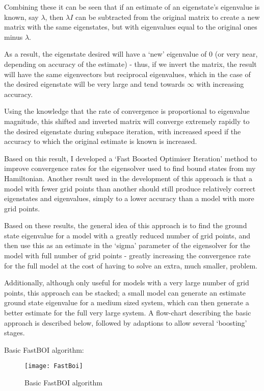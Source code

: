Combining these it can be seen that if an estimate of an eigenstate's eigenvalue is known, say $\lambda$, then $\lambda I$ can be subtracted from the original matrix to create a new matrix with the same eigenstates, but with eigenvalues equal to the original ones minus $\lambda$. 

As a result, the eigenstate desired will have a `new' eigenvalue of $0$ (or very near, depending on accuracy of the estimate) - thus, if we invert the matrix, the result will have the same eigenvectors but reciprocal eigenvalues, which in the case of the desired eigenstate will be very large and tend towards $\infty$ with increasing accuracy. 

Using the knowledge that the rate of convergence is proportional to eigenvalue magnitude, this shifted and inverted matrix will converge extremely rapidly to the desired eigenstate during subspace iteration, with increased speed if the accuracy to which the original estimate is known is increased.

Based on this result, I developed a `Fast Boosted Optimiser Iteration' method to improve convergence rates for the eigensolver used to find bound states from my Hamiltonian. Another result used in the development of this approach is that a model with fewer grid points than another should still produce relatively correct eigenstates and eigenvalues, simply to a lower accuracy than a model with more grid points. 

Based on these results, the general idea of this approach is to find the ground state eigenvalue for a model with a greatly reduced number of grid points, and then use this as an estimate in the `sigma' parameter of the eigensolver for the model with full number of grid points - greatly increasing the convergence rate for the full model at the cost of having to solve an extra, much smaller, problem. 

Additionally, although only useful for models with a very large number of grid points, this approach can be stacked; a small model can generate an estimate ground state eigenvalue for a medium sized system, which can then generate a better estimate for the full very large system. A flow-chart describing the basic approach is described below, followed by adaptions to allow several `boosting' stages.

Basic FastBOI algorithm:

\begin{figure}[!htb]
	\texttt{[image: FastBoi]}
	\centering
	\caption{Basic FastBOI algorithm}
\end{figure}

